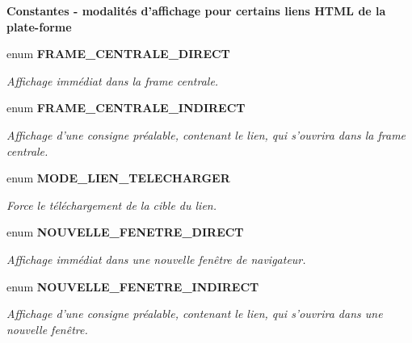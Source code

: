 \begin{Indent}{\bf Constantes - modalités d'affichage pour certains liens HTML de la plate-forme}\par
\begin{CompactItemize}
\item 
enum {\bf FRAME\_\-CENTRALE\_\-DIRECT} 
\begin{CompactList}\small\item\em Affichage immédiat dans la frame centrale. \item\end{CompactList}\item 
enum {\bf FRAME\_\-CENTRALE\_\-INDIRECT} 
\begin{CompactList}\small\item\em Affichage d'une consigne préalable, contenant le lien, qui s'ouvrira dans la frame centrale. \item\end{CompactList}\item 
enum {\bf MODE\_\-LIEN\_\-TELECHARGER} 
\begin{CompactList}\small\item\em Force le téléchargement de la cible du lien. \item\end{CompactList}\item 
enum {\bf NOUVELLE\_\-FENETRE\_\-DIRECT} 
\begin{CompactList}\small\item\em Affichage immédiat dans une nouvelle fenêtre de navigateur. \item\end{CompactList}\item 
enum {\bf NOUVELLE\_\-FENETRE\_\-INDIRECT} 
\begin{CompactList}\small\item\em Affichage d'une consigne préalable, contenant le lien, qui s'ouvrira dans une nouvelle fenêtre. \item\end{CompactList}\end{CompactItemize}
\end{Indent}
